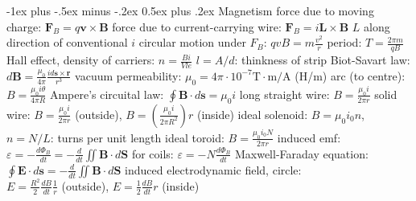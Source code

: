 \documentclass[10pt,landscape]{article}
\makeatletter
\renewcommand{\subsection}{\@startsection{subsection}{2}{0mm}%
                                {-1ex plus -.5ex minus -.2ex}%
                                {0.5ex plus .2ex}%
                                {\normalfont\normalsize\bfseries}}
\newcommand{\spc}{\hspace*{1em}}
\makeatother
\begin{document}
\begin{multicols*}{3}
\subsection{Magnetism}
force due to moving charge: $\mathbf{F}_B=q\mathbf{v}\times \mathbf{B}$
\newline
force due to current-carrying wire: $\mathbf{F}_B=i\mathbf{L}\times \mathbf{B}$ \newline
\spc $L$ along direction of conventional $i$
\newline
circular motion under $F_B$: $qvB=m\frac{v^2}{r}$
\newline
\spc period: $T=\frac{2\pi m}{qB}$
\newline
Hall effect, density of carriers: $n=\frac{Bi}{Vle}$
\newline
\spc $l=A/d$: thinkness of strip
\newline
Biot-Savart law: $d\mathbf{B}=\frac{\mu _0}{4\pi }\frac{id\mathbf{s\times \mathbf{r}}}{r^3}$
\newline
vacuum permeability: $\mu_0=4\pi\cdot10^{-7}\textrm{T}\cdot \textrm{m}/\textrm{A}$ (H/m)
\newline
\spc arc (to centre): $B=\frac{\mu _0i\theta }{4\pi R}$
\newline \newline
Ampere's circuital law: $\oint \mathbf{B}\cdot d\mathbf{s}=\mu _0i$
\newline
\spc long straight wire: $B=\frac{\mu _0i}{2\pi r}$
\newline
\spc solid wire: $B=\frac{\mu _0i}{2\pi r}$ (outside), $B=(\frac{\mu _0i}{2\pi R^2})r$ (inside)
\newline
\spc ideal solenoid: $B=\mu _0i_0n$, $n=N/L$: turns per unit length
\newline
\spc ideal toroid: $B=\frac{\mu _0i_0N}{2\pi r}$
\newline \newline
induced emf: $\varepsilon =-\frac{d\Phi _B}{dt}=-\frac{d}{dt} \iint \mathbf{B} \cdot d\mathbf{S}$
\newline
\spc for coils: $\varepsilon =-N\frac{d\Phi _B}{dt}$
\newline
Maxwell-Faraday equation: $\oint \mathbf{E}\cdot d\mathbf{s}=-\frac{d}{dt} \iint \mathbf{B}\cdot d\mathbf{S}$
\newline
\spc induced electrodynamic field, circle:
\\\spc$E=\frac{R^2}{2}\frac{dB}{dt}\frac{1}{r}$ (outside), $E=\frac{1}{2}\frac{dB}{dt}r$ (inside)


\end{multicols*}
\end{document}
